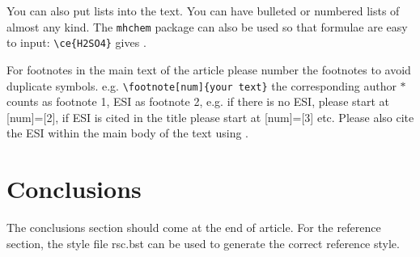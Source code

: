 \documentclass[twoside,twocolumn,9pt]{article}
\begin{document}
You can also put lists into the text. You can have bulleted or numbered lists of almost any kind. 
The \texttt{mhchem} package can also be used so that formulae are easy to input: \texttt{\textbackslash ce\{H2SO4\}} gives . 

For footnotes in the main text of the article please number the footnotes to avoid duplicate symbols. e.g. \texttt{\textbackslash footnote[num]\{your text\}} the corresponding author $\ast$ counts as footnote 1, ESI as footnote 2, e.g. if there is no ESI, please start at [num]=[2], if ESI is cited in the title please start at [num]=[3] etc. Please also cite the ESI within the main body of the text using \dag.

\section{Conclusions}
The conclusions section should come at the end of article. For the reference section, the style file rsc.bst can be used to generate the correct reference style.




 
\end{document}
